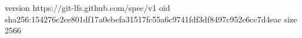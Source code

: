 version https://git-lfs.github.com/spec/v1
oid sha256:154276c2ce801df17a0ebefa31517fc55a6c9741fdf3df8497c952e6cc7d4eac
size 2566
